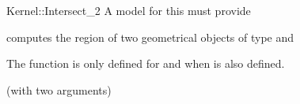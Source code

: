 \begin{ccRefFunctionObjectConcept}{Kernel::Intersect_2}
A model for this must provide


{computes the  region of two geometrical objects of type 
 and }

The function is only defined for  and 
when  is also defined.

\ccRefines
{} (with two arguments)

\ccSeeAlso
{}\\
\\

\end{ccRefFunctionObjectConcept}
